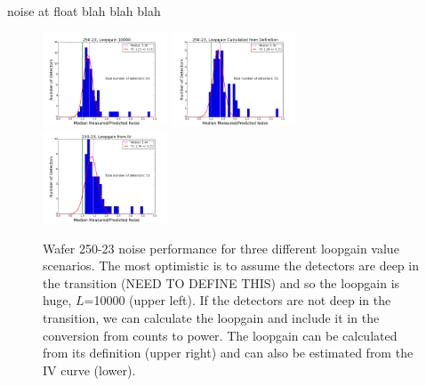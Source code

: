 noise at float blah blah blah

\begin{figure}[ht]
\centering
   \includegraphics[width=0.33\textwidth]{./figures/250-23_it_meas_pred_ratio_loopgain_10000.png}
   \includegraphics[width=0.33\textwidth]{./figures/250-23_it_meas_pred_ratio_loopgain_calc.png}
   \includegraphics[width=0.33\textwidth]{./figures/250-23_it_meas_pred_ratio_loopgain_iv.png}
\caption{Wafer 250-23 noise performance for three different loopgain value scenarios. The most optimistic is to assume the detectors are
                deep in the transition (NEED TO DEFINE THIS) and so the loopgain is huge, $L$=10000 (upper left). If the detectors are not 
                deep in the transition, we can calculate the loopgain and include it in the conversion from counts to power. The loopgain 
                can be calculated from its definition (upper right) and can also be estimated from the IV curve (lower).  
                \label{fig:effect_of_loopgain}}
\end{figure}


